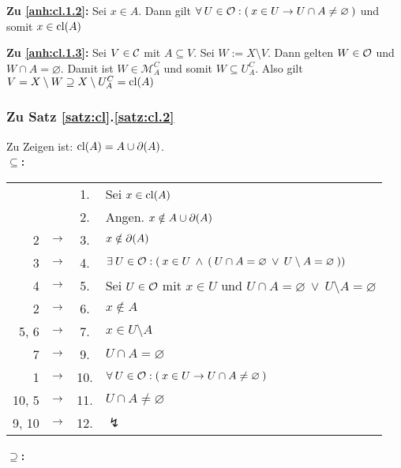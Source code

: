     \noindent	
    \textbf{Zu \ref{anh:cl.1.2}:} 
        Sei $x \in A$. Dann gilt $\forall\: U \in \mathcal{O} : (\: x \in U \rightarrow U \cap A \neq \varnothing \:)$ und somit $x \in \text{cl}(A)$

    \noindent
    \textbf{Zu \ref{anh:cl.1.3}:}
        Sei $V \in \mathcal{C}$ mit $A \subseteq V$. Sei $W := X \setminus V$. Dann gelten $W \in \mathcal{O}$ und $W \cap A = \varnothing$. Damit ist $W \in \mathcal{M}_A^C$ und somit $W \subseteq U_A^C$. Also gilt $ V = X \setminus W \supseteq X \setminus U_A^C = \text{cl}(A)$
        

\subsubsection{Zu Satz \ref{satz:cl}.\ref{satz:cl.2}} \label{anh:cl.2}
    Zu Zeigen ist: $\text{cl}(A) = A \cup \partial(A)$.\\

    \noindent
    \textbf{\glqq$\boldsymbol{\subseteq}$\grqq:}

        \begin{longtable}{r c c l}
            & & 1. & Sei $x \in \text{cl}(A)$ \\
            & & 2. & Angen. $x \notin A \cup \partial(A)$ \\
            2 & $\rightarrow$ & 3. & $x \notin \partial(A)$ \\
            3 & $\rightarrow$ & 4. & $\exists\: U \in \mathcal{O} : (\: x \in U \:\land\: (\: U \cap A = \varnothing \:\lor\: U \setminus A = \varnothing \:))$ \\
            4 & $\rightarrow$ & 5. & Sei $U \in \mathcal{O}$ mit $x \in U$ und $U \cap A = \varnothing \:\lor\: U \setminus A = \varnothing$ \\
            2 & $\rightarrow$ & 6. & $x \notin A$ \\
            5, 6 & $\rightarrow$ & 7. & $x \in U \setminus A$ \\
            7 & $\rightarrow$ & 9. & $U \cap A = \varnothing$ \\
            1 & $\rightarrow$ & 10. & $\forall\: U \in \mathcal{O} : (\: x \in U \to U \cap A \neq \varnothing \:)$ \\
            10, 5 & $\rightarrow$ & 11. & $U \cap A \neq \varnothing$ \\
            9, 10 & $\rightarrow$ & 12. & $\lightning$ 
        \end{longtable}	

    \noindent
    \textbf{\glqq$\boldsymbol{\supseteq}$\grqq:}

